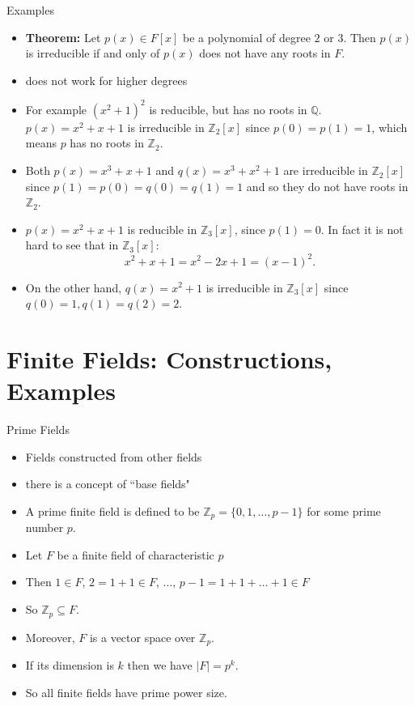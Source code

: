 \documentclass[ %
 10pt, xcolor={dvipsnames,svgnames,x11names,hyperref},
   hyperref={colorlinks=true,citecolor=green,linkcolor=DarkRed,urlcolor=ProcessBlue,anchorcolor=blue}
  ]{beamer}
\newenvironment{stepitemize}{\begin{itemize}[<+->]}{\end{itemize} }
\newcommand{\Z}{\mathbb{Z}}
\newcommand{\Q}{\mathbb{Q}}
\begin{document}
\begin{frame}{Examples}
\begin{stepitemize}
    \item {\bf Theorem:} Let $p(x)\in F[x]$ be a polynomial of degree $2$ or $3$. Then $p(x)$ is irreducible if and only of $p(x)$ does not have any roots in $F$.
\item does not work for higher degrees
\item For example $(x^2+1)^2$ is reducible, but has no roots in $\Q$.
$p(x)=x^2+x+1$ is irreducible in $\Z_2[x]$ since $p(0)=p(1)=1$, which means $p$ has no roots in $\Z_2$.
    \item Both $p(x)=x^3+x+1$ and $q(x)=x^3+x^2+1$ are irreducible in $\Z_2[x]$ since $p(1)=p(0)=q(0)=q(1)=1$ and so they do not have roots in $\Z_2$. 
    \item $p(x)=x^2+x+1$ is reducible in $\Z_3[x]$, since $p(1)=0$. In fact it is not hard to see that in $\Z_3[x]$:
    $$x^2+x+1 = x^2-2x+1 = (x-1)^2.$$
    \item On the other hand, $q(x)=x^2+1$ is irreducible in $\Z_3[x]$ since $q(0)=1, q(1)=q(2)=2$.
\end{stepitemize}
\end{frame}

\section{Finite Fields: Constructions, Examples}
\begin{frame}{Prime Fields}
\begin{stepitemize}
    \item Fields constructed from other fields
    \item there is a concept of ``base fields"
    \item A prime finite field is defined to be $\Z_p = \{0, 1,\dots, p-1\}$ for some prime number $p$.
    \item Let $F$ be a finite field of characteristic $p$
    \item Then $1\in F$, $2=1+1\in F$, $\dots$, $p-1=1+1+\dots +1 \in F$
    \item So $\Z_p\subseteq F$.
    \item Moreover, $F$ is a vector space over $\Z_p$.
    \item If its dimension is $k$ then we have $|F| = p^k$.
    \item So all finite fields have prime power size.
\end{stepitemize}
\end{frame}
\end{document}
